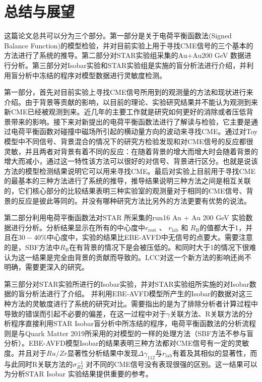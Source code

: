 

\setcounter{section}{0}

\setcounter{figure}{0}
\setcounter{table}{0}
\setcounter{equation}{0}

\chapter{总结与展望}

这篇论文总共可以分为三个部分。第一部分是关于电荷平衡函数法(Signed Balance Function)的模型检验，并对目前实验上用于寻找CME信号的三个基本的方法进行了系统的推导。第二部分对STAR实验组采集的Au+Au200 GeV 数据进行分析。第三部分对Isobar实验和STAR实验组是实施的盲分析法进行介绍，并利用盲分析中冻结的程序对模型数据进行灵敏度检测。

第一部分，首先对目前实验上寻找CME信号所用到的观测量的方法和现状进行来介绍。由于背景等贡献的影响，以目前的理论、实验研究结果并不能认为观测到来新CME已经被观测到来。近几年的主要工作就是研究如何更好的消除或者压低背景带来的影响。接下来对新提出的电荷平衡函数法进行了解读与检验，它主要是通过电荷平衡函数对碰撞中磁场所引起的横动量方向的波动来寻找CME。通过对Toy模型中不同信号、背景混合的情况下的研究方检验发现\rrest 和\rb 对CME信号的反应都很灵敏，并且两者对背景有着不同的反应：在\rrest 随着背景的增大而增大时\rb 会随着背景的增大而减小，通过这一特性该方法可以很好的对信号、背景进行区分。也就是说该方法的模型检测结果说明它可以用来寻找CME。最后对实验上目前用于寻找CME的最基本的三种方法进行了系统的推导，推导结果说明三种方法之间是相互关联的，它们核心部分的比较结果表明三种实验室的观测量对于相同的CME信号、背景的反应是彼此等同的。并没有哪种研究方法比另外的方法更要有优势的说法。


第二部分利用电荷平衡函数法对STAR 所采集的run16 Au + Au 200 GeV 实验数据进行分析。分析结果显示在所有的中心度中$r_{\mathrm{rest}}$ 、 $r_{\mathrm{lab}}$  和  $R_{\mathrm{B}}$的值都大于1，并且在$30-40\%$中心度中，实验的结果比EBE-AVFD中无信号的点要大。需要注意的是，SBF方法中$R_{\mathrm{B}}$在有背景的情况下是会被压低的。\rrest 和\rb 同时大于1的情况下很难认为这一结果是完全由背景的贡献而导致的。LCC对这一个新方法的影响还尚不明确，需要更深入的研究。


第三部分对STAR实验所进行的Isobar实验，并对STAR实验组所实施的对Isobar数据的盲分析法进行了介绍。
并利用EBE-AVFD模型所产生的Isobar的数据对这三种方法的灵敏度进行了系统的研究对比。需要指出的是为了排除分析者计算过程中导致的错误而引起不必要的偏差，在这一过程中对于$ \gamma$关联方法、R关联方法的分析程序直接利用STAR Isobar盲分析中所冻结的程序，电荷平衡函数法的分析流程则是与Quark Matter 2019所采用的对模型的一样的处理方法（SBF方法不参与盲分析）。EBE-AVFD模型Isobar的结果表明三种方法都对CME信号有一定的灵敏度。并且对于$Ru/Zr$显著性分析结果中发现$\Delta \gamma_{112}$与$r_{\mathrm{lab}}$有着及其相似的显著性，而与此同时R关联方法的$ \sigma_{R2}^{-1}$ 对不同的CME信号没有表现很强的区别。这一结果可以为分析STAR Isobar 实验结果提供重要的参考。